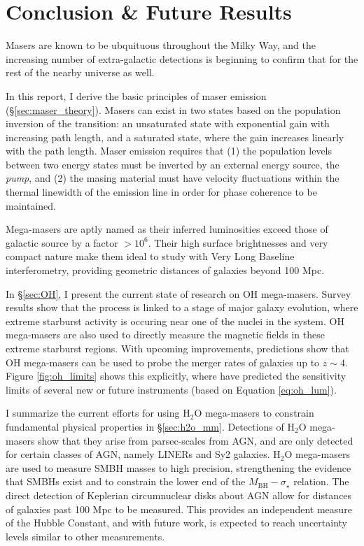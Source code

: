 \section{Conclusion \& Future Results}
\label{sec:conclusion}

Masers are known to be ubquituous throughout the Milky Way, and the increasing number of extra-galactic detections is beginning to confirm that for the rest of the nearby universe as well. 

In this report, I derive the basic principles of maser emission (\S\ref{sec:maser_theory}). Masers can exist in two states based on the population inversion of the transition: an unsaturated state with exponential gain with increasing path length, and a saturated state, where the gain increases linearly with the path length. Maser emission requires that (1) the population levels between two energy states must be inverted by an external energy source, the {\it pump}, and (2) the masing material must have velocity fluctuations within the thermal linewidth of the emission line in order for phase coherence to be maintained.

Mega-masers are aptly named as their inferred luminosities exceed those of galactic source by a factor $\gt 10^6$. Their high surface brightnesses and very compact nature make them ideal to study with Very Long Baseline interferometry, providing geometric distances of galaxies beyond 100 Mpc.

In  \S\ref{sec:OH}, I present the current state of research on OH mega-masers. Survey results show that the process is linked to a stage of major galaxy evolution, where extreme starburst activity is occuring near one of the nuclei in the system. OH mega-masers are also used to directly measure the magnetic fields in these extreme starburst regions. With upcoming improvements, predictions show that OH mega-masers can be used to probe the merger rates of galaxies up to $z\sim4$. Figure \ref{fig:oh_limits} shows this explicitly, where \citet{darling2002_lumfunc} have predicted the sensitivity limits of several new or future instruments (based on Equation \ref{eq:oh_lum}). 

I summarize the current efforts for using H$_2$O mega-masers to constrain fundamental physical properties in \S\ref{sec:h2o_mm}. Detections of H$_2$O mega-masers show that they arise from parsec-scales from AGN, and are only detected for certain classes of AGN, namely LINERs and Sy2 galaxies. H$_2$O mega-masers are used to measure SMBH masses to high precision, strengthening the evidence that SMBHs exist and to constrain the lower end of the $M_{\mathrm{BH}}-\sigma_{\star}$ relation. The direct detection of Keplerian circumnuclear disks about AGN allow for distances of galaxies past 100 Mpc to be measured. This provides an independent measure of the Hubble Constant, and with future work, is expected to reach uncertainty levels similar to other measurements.

